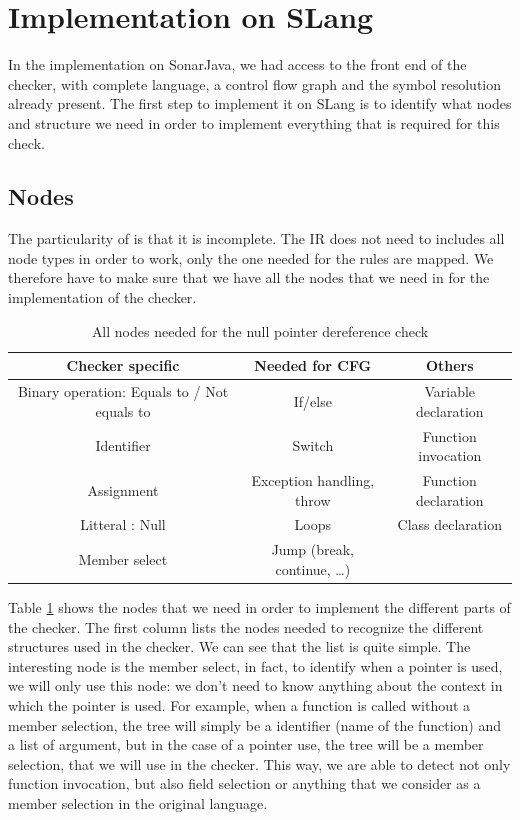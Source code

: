 \section{Implementation on SLang}
\label{sec:implementation_slang}

In the implementation on SonarJava, we had access to the front end of the checker, with complete language, a control flow graph and the symbol resolution already present.
The first step to implement it on SLang is to identify what nodes and structure we need in order to implement everything that is required for this check.

\subsection{Nodes}
\label{subsec:nodes}

The particularity of \slang is that it is incomplete. 
The IR does not need to includes all node types in order to work, only the one needed for the rules are mapped. 
We therefore have to make sure that we have all the nodes that we need in \slang for the implementation of the checker.

\begin{table}[h]
	\centering
	\caption{All nodes needed for the null pointer dereference check}
	\label{table:nodes-needed}
	\begin{tabular}{|c|c|c|}
		\hline
		\bf Checker specific & \bf Needed for CFG & \bf Others  \\ \hline
	    Binary operation: Equals to / Not equals to & If/else & Variable declaration \\
		Identifier & Switch & Function invocation \\
		Assignment & Exception handling, throw  & Function declaration \\
		Litteral : Null & Loops & Class declaration \\
		Member select & Jump (break, continue, …) & \\ \hline
	\end{tabular}
\end{table}

Table \ref{table:nodes-needed} shows the nodes that we need in order to implement the different parts of the checker.
The first column lists the nodes needed to recognize the different structures used in the checker. 
We can see that the list is quite simple. 
The interesting node is the member select, in fact, to identify when a pointer is used, we will only use this node: we don’t need to know anything about the context in which the pointer is used. 
For example, when a function is called without a member selection, the tree will simply be a identifier (name of the function) and a list of argument, but in the case of a pointer use, the tree will be a member selection, that we will use in the checker. 
This way, we are able to detect not only function invocation, but also field selection or anything that we consider as a member selection in the original language.

